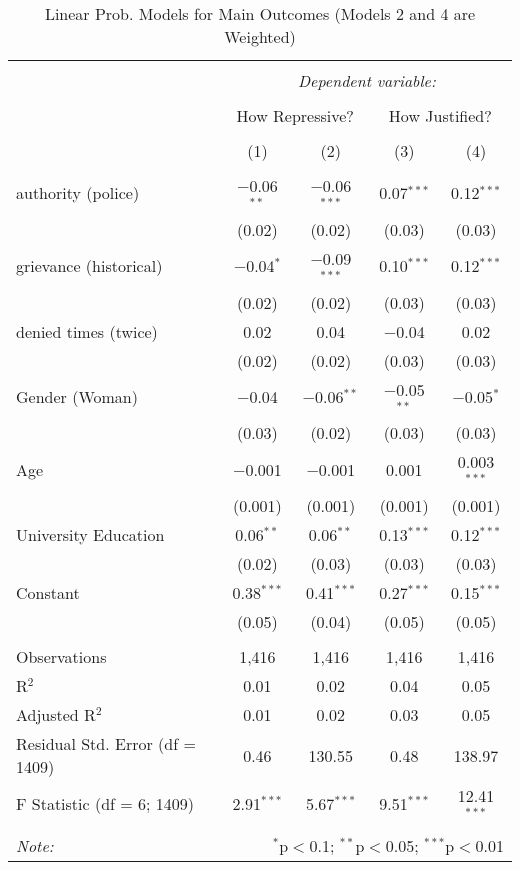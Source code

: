 
\begin{table}[!htbp] \centering 
  \caption{Linear Prob. Models for Main Outcomes (Models 2 and 4 are Weighted)} 
  \label{} 
\begin{tabular}{@{\extracolsep{5pt}}lcccc} 
\\[-1.8ex]\hline 
\hline \\[-1.8ex] 
 & \multicolumn{4}{c}{\textit{Dependent variable:}} \\ 
\cline{2-5} 
\\[-1.8ex] & \multicolumn{2}{c}{How Repressive?} & \multicolumn{2}{c}{How Justified?} \\ 
\\[-1.8ex] & (1) & (2) & (3) & (4)\\ 
\hline \\[-1.8ex] 
 authority (police) & $-$0.06$^{**}$ & $-$0.06$^{***}$ & 0.07$^{***}$ & 0.12$^{***}$ \\ 
  & (0.02) & (0.02) & (0.03) & (0.03) \\ 
  grievance (historical) & $-$0.04$^{*}$ & $-$0.09$^{***}$ & 0.10$^{***}$ & 0.12$^{***}$ \\ 
  & (0.02) & (0.02) & (0.03) & (0.03) \\ 
  denied times (twice) & 0.02 & 0.04 & $-$0.04 & 0.02 \\ 
  & (0.02) & (0.02) & (0.03) & (0.03) \\ 
  Gender (Woman) & $-$0.04 & $-$0.06$^{**}$ & $-$0.05$^{**}$ & $-$0.05$^{*}$ \\ 
  & (0.03) & (0.02) & (0.03) & (0.03) \\ 
  Age & $-$0.001 & $-$0.001 & 0.001 & 0.003$^{***}$ \\ 
  & (0.001) & (0.001) & (0.001) & (0.001) \\ 
  University Education & 0.06$^{**}$ & 0.06$^{**}$ & 0.13$^{***}$ & 0.12$^{***}$ \\ 
  & (0.02) & (0.03) & (0.03) & (0.03) \\ 
  Constant & 0.38$^{***}$ & 0.41$^{***}$ & 0.27$^{***}$ & 0.15$^{***}$ \\ 
  & (0.05) & (0.04) & (0.05) & (0.05) \\ 
 \hline \\[-1.8ex] 
Observations & 1,416 & 1,416 & 1,416 & 1,416 \\ 
R$^{2}$ & 0.01 & 0.02 & 0.04 & 0.05 \\ 
Adjusted R$^{2}$ & 0.01 & 0.02 & 0.03 & 0.05 \\ 
Residual Std. Error (df = 1409) & 0.46 & 130.55 & 0.48 & 138.97 \\ 
F Statistic (df = 6; 1409) & 2.91$^{***}$ & 5.67$^{***}$ & 9.51$^{***}$ & 12.41$^{***}$ \\ 
\hline 
\hline \\[-1.8ex] 
\textit{Note:}  & \multicolumn{4}{r}{$^{*}$p$<$0.1; $^{**}$p$<$0.05; $^{***}$p$<$0.01} \\ 
\end{tabular} 
\end{table} 
